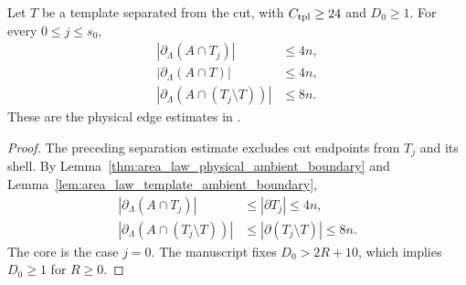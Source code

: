 \begin{lemma}
    \label{thm:area_law_template_physical_boundary}
    \leanok
    Let $T$ be a template separated from the cut, with $C_{\rm tpl}\ge24$
    and $D_0\ge1$. For every $0\le j\le s_0$,
    \begin{align}
        |\partial_\Lambda(A\cap T_j)|             & \le4n, \\
        |\partial_\Lambda(A\cap T)|               & \le4n, \\
        |\partial_\Lambda(A\cap(T_j\setminus T))| & \le8n.
    \end{align}
    These are the physical edge estimates in
    \cite[Lemma~9.4]{OpenAI2026AreaLaw}.
\end{lemma}
\begin{proof}
    \leanok
    The preceding separation estimate excludes cut endpoints from $T_j$
    and its shell. By Lemma~\ref{thm:area_law_physical_ambient_boundary}
    and Lemma~\ref{lem:area_law_template_ambient_boundary},
    \begin{align}
        |\partial_\Lambda(A\cap T_j)|             & \le|\partial T_j|\le4n,             \\
        |\partial_\Lambda(A\cap(T_j\setminus T))| & \le|\partial(T_j\setminus T)|\le8n.
    \end{align}
    The core is the case $j=0$.
    The manuscript fixes $D_0>2R+10$, which implies $D_0\ge1$ for $R\ge0$.
\end{proof}

